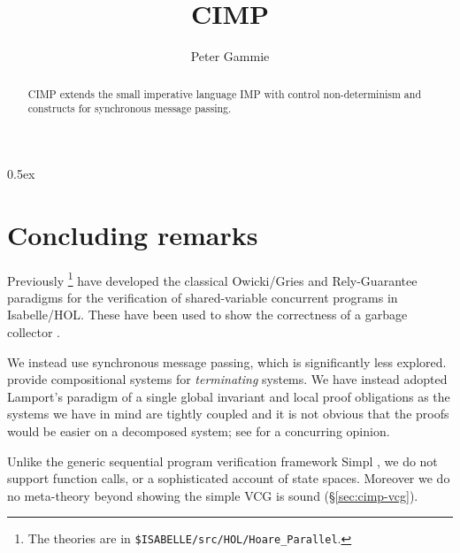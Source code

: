 \documentclass[11pt,a4paper]{article}
\begin{document}
\title{CIMP}
\author{Peter Gammie}
\maketitle

\begin{abstract}
  CIMP extends the small imperative language IMP with control
  non-determinism and constructs for synchronous message passing.
\end{abstract}

\tableofcontents

\parindent 0pt\parskip 0.5ex



\section{Concluding remarks}

Previously
\citet{DBLP:conf/fase/NipkowN99,Prensa-PhD,Prensa-ESOP03}\footnote{The
  theories are in \texttt{\$ISABELLE/src/HOL/Hoare\_Parallel}.} have
developed the classical Owicki/Gries and Rely-Guarantee paradigms for
the verification of shared-variable concurrent programs in
Isabelle/HOL. These have been used to show the correctness of a
garbage collector \citep{PrenEsp00}.

We instead use synchronous message passing, which is significantly
less explored.
\citet{DBLP:conf/mfcs/BoerRH99,DBLP:books/cu/RoeverBH2001} provide
compositional systems for \emph{terminating} systems. We have instead
adopted Lamport's paradigm of a single global invariant and local
proof obligations as the systems we have in mind are tightly coupled
and it is not obvious that the proofs would be easier on a decomposed
system; see \citet[\S1.6.6]{DBLP:books/cu/RoeverBH2001} for a
concurring opinion.

Unlike the generic sequential program verification framework Simpl
\citep{DBLP:conf/lpar/Schirmer04}, we do not support function calls,
or a sophisticated account of state spaces. Moreover we do no
meta-theory beyond showing the simple VCG is sound
(\S\ref{sec:cimp-vcg}).



\end{document}
